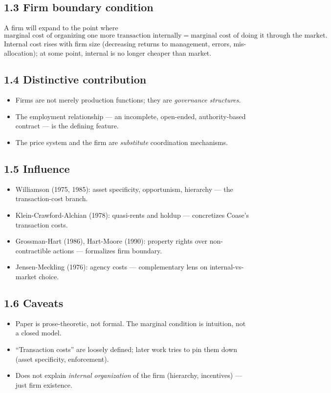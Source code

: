 \documentclass[11pt]{article}
\begin{document}
\subsection*{1.3 Firm boundary condition}
A firm will expand to the point where
\[
\text{marginal cost of organizing one more transaction internally} = \text{marginal cost of doing it through the market}.
\]
Internal cost rises with firm size (decreasing returns to management, errors, mis-allocation); at some point, internal is no longer cheaper than market.

\subsection*{1.4 Distinctive contribution}
\begin{itemize}
\item Firms are not merely production functions; they are \emph{governance structures}.
\item The employment relationship --- an incomplete, open-ended, authority-based contract --- is the defining feature.
\item The price system and the firm are \emph{substitute} coordination mechanisms.
\end{itemize}

\subsection*{1.5 Influence}
\begin{itemize}
\item Williamson (1975, 1985): asset specificity, opportunism, hierarchy --- the transaction-cost branch.
\item Klein-Crawford-Alchian (1978): quasi-rents and holdup --- concretizes Coase's transaction costs.
\item Grossman-Hart (1986), Hart-Moore (1990): property rights over non-contractible actions --- formalizes firm boundary.
\item Jensen-Meckling (1976): agency costs --- complementary lens on internal-vs-market choice.
\end{itemize}

\subsection*{1.6 Caveats}
\begin{alertbox}
\begin{itemize}
\item Paper is prose-theoretic, not formal. The marginal condition is intuition, not a closed model.
\item ``Transaction costs'' are loosely defined; later work tries to pin them down (asset specificity, enforcement).
\item Does not explain \emph{internal organization} of the firm (hierarchy, incentives) --- just firm existence.
\end{itemize}
\end{alertbox}
\end{document}
